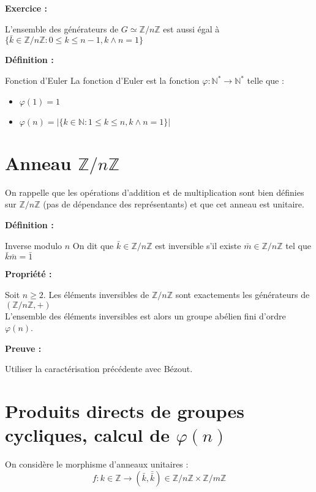 \documentclass{report}
\newenvironment{definition}[1][]{
    \begin{tcolorbox}[colframe= white]
    \textbf{Définition :} 
    #1 \par
    }
    {\end{tcolorbox}}
\newenvironment{preuve}{\begin{tcolorbox}[colframe= white]
    \textbf{Preuve :}
\par }
    {\end{tcolorbox}}
\newenvironment{prop}{\begin{tcolorbox}[colframe= white]
    \textbf{Propriété :}
     \par}
    {\end{tcolorbox}}
\newenvironment{exo}{\begin{tcolorbox}[colframe= white]
    \textbf{Exercice :}
    \par}
    {\end{tcolorbox}}
\begin{document}
\begin{exo}
	L'ensemble des générateurs de $G \simeq \mathbb{Z}/n\mathbb{Z}$ est aussi égal à $\{\bar{k} \in \mathbb{Z}/n\mathbb{Z} : 0 \leq k \leq n-1, k \wedge n =1\}$
\end{exo}

\begin{definition}{Fonction d'Euler}
	La fonction d'Euler est la fonction $\varphi : \mathbb{N}^* \rightarrow \mathbb{N}^*$ telle que :
\begin{itemize}
\item $\varphi (1) = 1$ 
\item $\varphi (n) = | \{k \in \mathbb{N} : 1 \leq k \leq n, k \wedge n =1 \}|$
		
\end{itemize}
\end{definition}




\section{\texorpdfstring{Anneau $\mathbb{Z}/n\mathbb{Z}$}{Anneau Z/nZ}}

On rappelle que les opérations d'addition et de multiplication sont bien définies sur $\mathbb{Z}/n\mathbb{Z}$ (pas de dépendance des représentants) et que cet anneau est unitaire. 

\begin{definition}{Inverse modulo $n$}
On dit que $\bar{k}\in \mathbb{Z}/n\mathbb{Z}$ est inversible s'il existe $\bar{m} \in \mathbb{Z}/n\mathbb{Z}$ tel que $\bar{k}\bar{m}=\bar{1}$
\end{definition}

\begin{prop}
	Soit $n \geq 2$. Les éléments inversibles de $\mathbb{Z}/n\mathbb{Z}$ sont exactements les générateurs de $\left (\mathbb{Z}/n\mathbb{Z}, + \right)$ \\
	L'ensemble des éléments inversibles est alors un groupe abélien fini d'ordre $\varphi (n)$.
\end{prop}
\begin{preuve}
	Utiliser la caractérisation précédente avec Bézout.
\end{preuve}

\section{\texorpdfstring{Produits directs de groupes cycliques, calcul de $\varphi (n)$}{Produits, directs de groupes cycliques, indicatrice d'Euler}}
On considère le morphisme d'anneaux unitaires : $$f : k\in \mathbb{Z} \to (\bar{k}, \bar{\bar{k}}) \in \mathbb{Z}/n\mathbb{Z} \times \mathbb{Z}/m\mathbb{Z}$$
\end{document}
